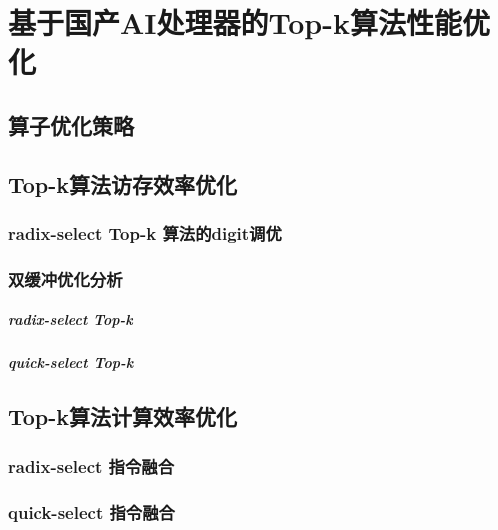 \chapter{基于国产AI处理器的Top-k算法性能优化}
\section{算子优化策略}
\section{Top-k算法访存效率优化}
\subsection{radix-select Top-k 算法的digit调优}

\subsection{双缓冲优化分析}
\paragraph{radix-select Top-k}

\paragraph{quick-select Top-k}



\section{Top-k算法计算效率优化}
\subsection{radix-select 指令融合}

\subsection{quick-select 指令融合}
